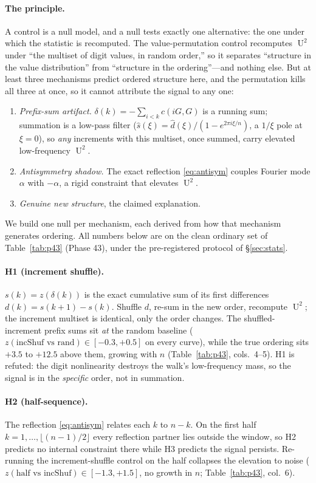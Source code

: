 \documentclass[11pt]{article}
\theoremstyle{definition}
\DeclareMathOperator{\Uk}{U}
\begin{document}
\paragraph{The principle.} A control is a null model, and a null tests
exactly one alternative: the one under which the statistic is recomputed.
The value-permutation control recomputes $\Uk^2$ under ``the multiset of
digit values, in random order,'' so it separates ``structure in the value
distribution'' from ``structure in the ordering''---and nothing else. But
at least three mechanisms predict ordered structure here, and the
permutation kills all three at once, so it cannot attribute the signal to
any one:
\begin{enumerate}
\item[(H1)] \emph{Prefix-sum artifact.} $\delta(k)=-\sum_{i<k}c(iG,G)$ is
a running sum; summation is a low-pass filter
($\hat s(\xi)=\hat d(\xi)/(1-e^{2\pi i\xi/n})$, a $1/\xi$ pole at
$\xi=0$), so \emph{any} increments with this multiset, once summed, carry
elevated low-frequency $\Uk^2$.
\item[(H2)] \emph{Antisymmetry shadow.} The exact reflection
\eqref{eq:antisym} couples Fourier mode $\alpha$ with $-\alpha$, a rigid
constraint that elevates $\Uk^2$.
\item[(H3)] \emph{Genuine new structure}, the claimed explanation.
\end{enumerate}
We build one null per mechanism, each derived from how that mechanism
generates ordering. All numbers below are on the clean ordinary set of
Table~\ref{tab:p43} (Phase 43), under the pre-registered protocol of
\S\ref{sec:stats}.

\paragraph{H1 (increment shuffle).} $s(k)=z(\delta(k))$ is the exact
cumulative sum of its first differences $d(k)=s(k+1)-s(k)$. Shuffle $d$,
re-sum in the new order, recompute $\Uk^2$; the increment multiset is
identical, only the order changes. The shuffled-increment prefix sums sit
\emph{at} the random baseline ($z(\text{incShuf vs rand})\in[-0.3,+0.5]$
on every curve), while the true ordering sits $+3.5$ to $+12.5$ above
them, growing with $n$ (Table~\ref{tab:p43}, cols.\ 4--5). H1 is refuted:
the digit nonlinearity destroys the walk's low-frequency mass, so the
signal is in the \emph{specific} order, not in summation.

\paragraph{H2 (half-sequence).} The reflection \eqref{eq:antisym} relates
each $k$ to $n-k$. On the first half $k=1,\dots,\lfloor(n-1)/2\rfloor$
every reflection partner lies outside the window, so H2 predicts no
internal constraint there while H3 predicts the signal persists.
Re-running the increment-shuffle control on the half collapses the
elevation to noise ($z(\text{half vs incShuf})\in[-1.3,+1.5]$, no growth
in $n$; Table~\ref{tab:p43}, col.\ 6).
\end{document}
